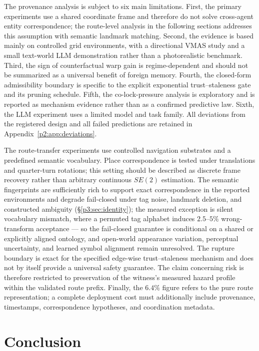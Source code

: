 \documentclass{article}
\begin{document}
The provenance analysis is subject to six main limitations. First,
the primary experiments use a shared coordinate frame and therefore
do not solve cross-agent entity correspondence; the route-level
analysis in the following sections addresses this assumption with
semantic landmark matching. Second, the evidence
is based mainly on controlled grid environments, with a directional
VMAS study and a small text-world LLM demonstration rather than a
photorealistic benchmark. Third, the sign of counterfactual warp gain
is regime-dependent and should not be summarized as a universal
benefit of foreign memory. Fourth, the closed-form admissibility boundary is
specific to the explicit exponential trust--staleness gate and its
pruning schedule. Fifth, the co-lock-pressure analysis is exploratory
and is reported as mechanism evidence rather than as a confirmed
predictive law. Sixth, the LLM experiment uses a limited model and task
family. All deviations from the registered design and all failed
predictions are retained in Appendix~\ref{p2:app:deviations}.


\label{p3:sec:limits}

The route-transfer experiments use controlled navigation substrates
and a predefined semantic vocabulary. Place correspondence is tested
under translations and quarter-turn rotations; this setting should be
described as discrete frame recovery rather than arbitrary continuous
$SE(2)$ estimation. The semantic fingerprints are sufficiently rich
to support exact correspondence in the reported environments and
degrade fail-closed under tag noise, landmark deletion, and
constructed ambiguity (\S\ref{p3:sec:identity}); the measured
exception is silent vocabulary mismatch, where a permuted tag
alphabet induces $2.5$--$5\%$ wrong-transform acceptance --- so the
fail-closed guarantee is conditional on a shared or explicitly
aligned ontology, and open-world appearance variation, perceptual
uncertainty, and learned symbol alignment remain unresolved. The rupture boundary is exact for the
specified edge-wise trust--staleness mechanism and does not by itself
provide a universal safety guarantee. The claim concerning risk is
therefore restricted to preservation of the witness's measured hazard
profile within the validated route prefix. Finally, the $6.4\%$ figure
refers to the pure route representation; a complete deployment cost
must additionally include provenance, timestamps, correspondence
hypotheses, and coordination metadata.


\section{Conclusion}
\end{document}
